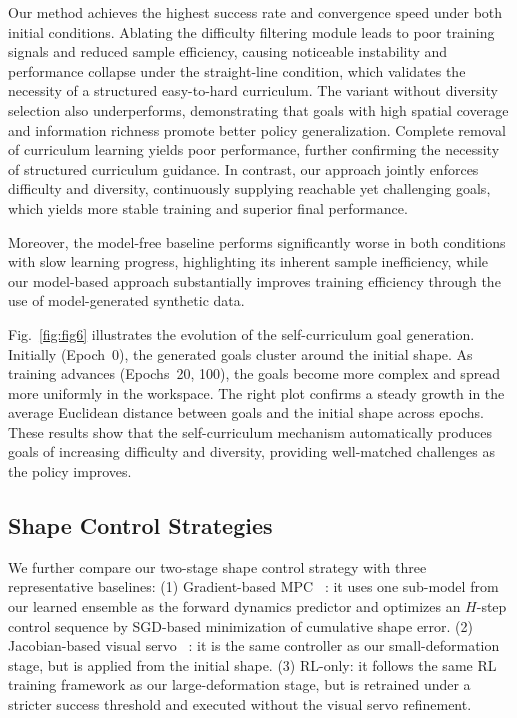 \documentclass[letterpaper, 10 pt, conference]{ieeeconf}  %
\begin{document}
Our method achieves the highest success rate and convergence speed under both initial conditions. Ablating the difficulty filtering module leads to poor training signals and reduced sample efficiency, causing noticeable instability and performance collapse under the straight-line condition, which validates the necessity of a structured easy-to-hard curriculum. The variant without diversity selection also underperforms, demonstrating that goals with high spatial coverage and information richness promote better policy generalization. Complete removal of curriculum learning yields poor performance, further confirming the necessity of structured curriculum guidance. In contrast, our approach jointly enforces difficulty and diversity, continuously supplying reachable yet challenging goals, which yields more stable training and superior final performance.





Moreover, the model-free baseline performs significantly worse in both conditions with slow learning progress, highlighting its inherent sample inefficiency, while our model-based approach substantially improves training efficiency through the use of model-generated synthetic data.




Fig.~\ref{fig:fig6} illustrates the evolution of the self-curriculum goal generation. Initially (Epoch~0), the generated goals cluster around the initial shape. As training advances (Epochs~20, 100), the goals become more complex and spread more uniformly in the workspace. The right plot confirms a steady growth in the average Euclidean distance between goals and the initial shape across epochs. These results show that the self-curriculum mechanism automatically produces goals of increasing difficulty and diversity, providing well-matched challenges as the policy improves.




\subsection{Shape Control Strategies}



We further compare our two-stage shape control strategy with three representative baselines:
(1) Gradient-based MPC ~\cite{gu2025learning,yang2022online,li2018learning}: it uses one sub-model from our learned ensemble as the forward dynamics predictor and optimizes an $H$-step control sequence by SGD-based minimization of cumulative shape error.
(2) Jacobian-based visual servo ~\cite{zhu2018dual,jin2019robust}: it is the same controller as our small-deformation stage, but is applied from the initial shape.
(3) RL-only: it follows the same RL training framework as our large-deformation stage, but is retrained under a stricter success threshold and executed without the visual servo refinement.
\end{document}
